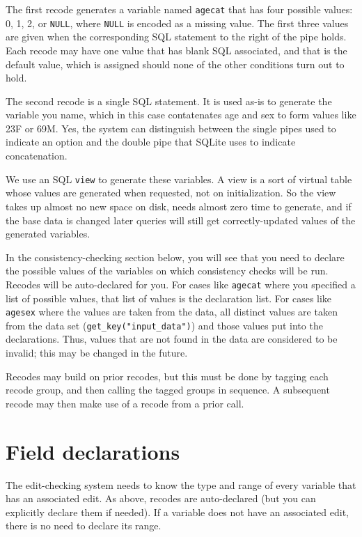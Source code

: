 \documentclass{article}
\begin{document}
The first recode generates a variable named {\tt agecat} that has four possible values: 0,
1, 2, or {\tt NULL}, where {\tt NULL} is encoded as a missing value. The first three
values are given when the corresponding SQL statement to the right of the pipe
holds. Each recode may have one value that has blank SQL associated, and that is
the default value, which is assigned should none of the other conditions turn out to
hold. 

The second recode is a single SQL statement. It is used as-is to generate the variable you
name, which in this case contatenates age and sex to form values like 23F or 69M. Yes, the
system can distinguish between the single pipes used to indicate an option and the double
pipe that SQLite uses to indicate concatenation.

We use an SQL {\tt view} to generate these variables. A view is a sort of virtual table
whose values are generated when requested, not on initialization. So the view takes up
almost no new space on disk, needs almost zero time to generate, and if the base data is
changed later queries will still get correctly-updated values of the generated variables.

In the consistency-checking section below, you will see that you need to declare the
possible values of the variables on which consistency checks will be run. Recodes will
be auto-declared for you. For cases like {\tt agecat} where you specified a list of
possible values, that list of values is the declaration list. For cases like {\tt agesex}
where the values are taken from the data, all distinct values are taken from the data
set ({\tt get\_key("input\_data")}) and those values put into the declarations. Thus,
values that are not found in the data are considered to be invalid; this may be changed
in the future.

Recodes may build on prior recodes, but this must be done by tagging each recode group,
and then calling the tagged groups in sequence. A subsequent recode may then make use of a
recode from a prior call.

\section{Field declarations} The edit-checking system needs to know the type and range
of every variable that has an associated edit. As above, recodes are auto-declared (but
you can explicitly declare them if needed). If a variable does not have an associated
edit, there is no need to declare its range.
\end{document}
